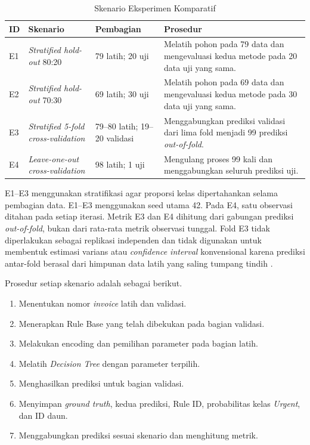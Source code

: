 \begin{table}[htbp]
    \centering
    \caption{Skenario Eksperimen Komparatif}
    \label{tab:skenario-eksperimen-bab-tiga}
    \scriptsize
    \renewcommand{\arraystretch}{1.2}
    \begin{tabularx}{\textwidth}{p{}p{}p{}X}
        \toprule
        \textbf{ID} & \textbf{Skenario} & \textbf{Pembagian} & \textbf{Prosedur} \\
        \midrule
        E1 & \textit{Stratified hold-out} 80:20 & 79 latih; 20 uji & Melatih pohon pada 79 data dan mengevaluasi kedua metode pada 20 data uji yang sama. \\
        E2 & \textit{Stratified hold-out} 70:30 & 69 latih; 30 uji & Melatih pohon pada 69 data dan mengevaluasi kedua metode pada 30 data uji yang sama. \\
        E3 & \textit{Stratified 5-fold cross-validation} & 79--80 latih; 19--20 validasi & Menggabungkan prediksi validasi dari lima fold menjadi 99 prediksi \textit{out-of-fold}. \\
        E4 & \textit{Leave-one-out cross-validation} & 98 latih; 1 uji & Mengulang proses 99 kali dan menggabungkan seluruh prediksi uji. \\
        \bottomrule
    \end{tabularx}
\end{table}

E1--E3 menggunakan stratifikasi agar proporsi kelas dipertahankan selama pembagian data. E1--E3 menggunakan seed utama 42. Pada E4, satu observasi ditahan pada setiap iterasi. Metrik E3 dan E4 dihitung dari gabungan prediksi \textit{out-of-fold}, bukan dari rata-rata metrik observasi tunggal. Fold E3 tidak diperlakukan sebagai replikasi independen dan tidak digunakan untuk membentuk estimasi varians atau \textit{confidence interval} konvensional karena prediksi antar-fold berasal dari himpunan data latih yang saling tumpang tindih \cite{BatesEtAl2024CV}.

Prosedur setiap skenario adalah sebagai berikut.

\begin{enumerate}
    \item Menentukan nomor \textit{invoice} latih dan validasi.
    \item Menerapkan Rule Base yang telah dibekukan pada bagian validasi.
    \item Melakukan encoding dan pemilihan parameter pada bagian latih.
    \item Melatih \textit{Decision Tree} dengan parameter terpilih.
    \item Menghasilkan prediksi untuk bagian validasi.
    \item Menyimpan \textit{ground truth}, kedua prediksi, Rule ID, probabilitas kelas \textit{Urgent}, dan ID daun.
    \item Menggabungkan prediksi sesuai skenario dan menghitung metrik.
\end{enumerate}

